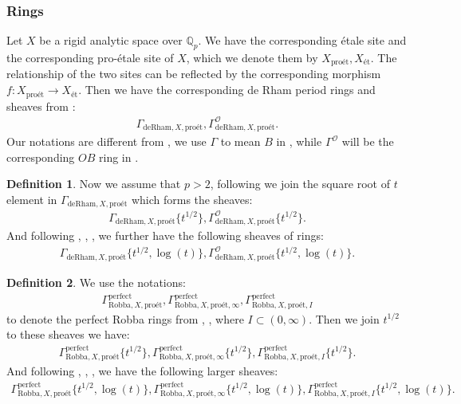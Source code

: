 \documentclass[12pt]{book}
\theoremstyle{definition}
\newtheorem{definition}{Definition}
\begin{document}
\subsubsection{Rings}

\noindent Let $X$ be a rigid analytic space over $\mathbb{Q}_p$. We have the corresponding \'etale site and the corresponding pro-\'etale site of $X$, which we denote them by $X_{\text{pro\'et}},X_\text{\'et}$. The relationship of the two sites can be reflected by the corresponding morphism $f:X_{\text{pro\'et}}\longrightarrow X_\text{\'et}$. Then we have the corresponding de Rham period rings and sheaves from \cite{Sch1}:
\begin{align}
\Gamma_{\text{deRham},X,\text{pro\'et}}, \Gamma^\mathcal{O}_{\text{deRham},X,\text{pro\'et}}.
\end{align}
Our notations are different from \cite{Sch1}, we use $\Gamma$ to mean $B$ in \cite{Sch1}, while $\Gamma^\mathcal{O}$ will be the corresponding $OB$ ring in \cite{Sch1}.\\

\begin{definition}
\indent Now we assume that $p>2$, following \cite{BS} we join the square root of $t$ element in $\Gamma_{\text{deRham},X,\text{pro\'et}}$ which forms the sheaves:
\begin{align}
\Gamma_{\text{deRham},X,\text{pro\'et}}\{t^{1/2}\},\Gamma^\mathcal{O}_{\text{deRham},X,\text{pro\'et}}\{t^{1/2}\}.
\end{align}
And following \cite{BL1}, \cite{BL2}, \cite{Fon1}, \cite{BHS} we further have the following sheaves of rings:
\begin{align}
\Gamma_{\text{deRham},X,\text{pro\'et}}\{t^{1/2},\log(t)\},\Gamma^\mathcal{O}_{\text{deRham},X,\text{pro\'et}}\{t^{1/2},\log(t)\}.
\end{align}
\end{definition}


\begin{definition}
We use the notations:
\begin{align}
\Gamma^\mathrm{perfect}_{\text{Robba},X,\text{pro\'et}},\Gamma^\mathrm{perfect}_{\text{Robba},X,\text{pro\'et},\infty},\Gamma^\mathrm{perfect}_{\text{Robba},X,\text{pro\'et},I}
\end{align}
to denote the perfect Robba rings from \cite{KL1}, \cite{KL2}, where $I\subset (0,\infty)$. Then we join $t^{1/2}$ to these sheaves we have:
\begin{align}
\Gamma^\mathrm{perfect}_{\text{Robba},X,\text{pro\'et}}\{t^{1/2}\},\Gamma^\mathrm{perfect}_{\text{Robba},X,\text{pro\'et},\infty}\{t^{1/2}\},\Gamma^\mathrm{perfect}_{\text{Robba},X,\text{pro\'et},I}\{t^{1/2}\}.
\end{align}
And following \cite{BL1}, \cite{BL2}, \cite{Fon1}, \cite{BHS} we have the following larger sheaves:
\begin{align}
\Gamma^\mathrm{perfect}_{\text{Robba},X,\text{pro\'et}}\{t^{1/2},\log(t)\},\Gamma^\mathrm{perfect}_{\text{Robba},X,\text{pro\'et},\infty}\{t^{1/2},\log(t)\},\Gamma^\mathrm{perfect}_{\text{Robba},X,\text{pro\'et},I}\{t^{1/2},\log(t)\}.
\end{align} 
\end{definition}
\end{document}
